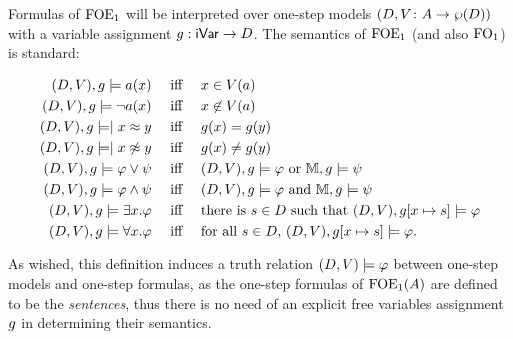 
Formulas of $\mathrm{FOE}_1$ will be interpreted over one-step models $(D,V \colon A \to \wp(D))$ with a variable assignment $g: \mathsf{iVar} \to D$. The semantics of $\mathrm{FOE}_1$ (and also $\mathrm{FO}_1$) is standard:
%

\begin{align*}
(D, \val),\ass \models a(x) & \quad\text{ iff }\quad  x \in \val(a) \\
(D, \val),\ass \models \lnot a(x) & \quad\text{ iff }\quad  x \not\in \val(a) \\
(D, \val),\ass \models \mid x \foeq y & \quad\text{ iff }\quad \ass(x) = \ass(y) \\
(D, \val),\ass \models \mid x \not\foeq y & \quad\text{ iff }\quad \ass(x) \neq \ass(y) \\
(D, \val),\ass \models \varphi\lor\psi & \quad\text{ iff }\quad  (D, \val),\ass \models \varphi \text{ or } \npmodel,\ass \models \psi \\
(D, \val),\ass \models \varphi\land\psi & \quad\text{ iff }\quad  (D, \val),\ass \models \varphi \text{ and } \npmodel,\ass \models \psi \\
(D, \val),\ass \models \exists x.\varphi & \quad\text{ iff }\quad  \text{there is $s \in D$ such that $(D, \val), \ass[x\mapsto s] \models \varphi$}\\
(D, \val),\ass \models \forall x.\varphi & \quad\text{ iff }\quad  \text{for all $s \in D$, } (D, \val), \ass[x\mapsto s] \models \varphi.
\end{align*}

As wished, this definition induces a truth relation $(D, V) \models \varphi$ between one-step models and one-step formulas, as the one-step formulas of $\mathrm{FOE}_1(A)$ are defined to be the \emph{sentences}, thus there is no need of an explicit free variables assignment $g$ in determining their semantics.

